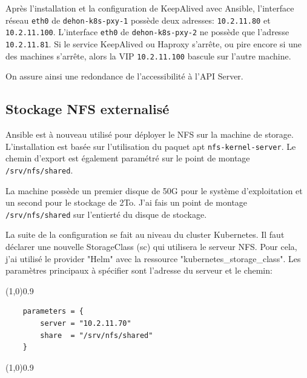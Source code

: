\documentclass[12pt]{article}
\begin{document}
Après l'installation et la configuration de KeepAlived avec \gls{Ansible}, l'interface réseau \verb|eth0| de \verb|dehon-k8s-pxy-1| possède deux adresses: \verb|10.2.11.80| et \verb|10.2.11.100|.
L'interface \verb|eth0| de \verb|dehon-k8s-pxy-2| ne possède que l'adresse \verb|10.2.11.81|.
Si le service KeepAlived ou Haproxy s'arrête, ou pire encore si une des machines s'arrête, alors la \gls{VIP}  \verb|10.2.11.100| bascule sur l'autre machine.

On assure ainsi une redondance de l'accessibilité à l'\gls{API} Server.

\subsection{Stockage NFS externalisé}
\gls{Ansible} est à nouveau utilisé pour déployer le NFS sur la machine de storage.
L'installation est basée sur l'utilisation du paquet apt \verb|nfs-kernel-server|.
Le chemin d'export est également paramétré sur le point de montage \verb|/srv/nfs/shared|.

La machine possède un premier disque de 50G pour le système d'exploitation et un second pour le stockage de 2To.
J'ai fais un point de montage \verb|/srv/nfs/shared| sur l'entierté du disque de stockage.

La suite de la configuration se fait au niveau du \gls{cluster} \gls{Kubernetes}.
Il faut déclarer une nouvelle StorageClass (sc) qui utilisera le serveur NFS.
Pour cela, j'ai utilisé le provider "Helm" avec la ressource "kubernetes\_storage\_class".
Les paramètres principaux à spécifier sont l'adresse du serveur et le chemin:
\vspace{-1ex}
\begin{code}
\vspace{-1ex}
\begin{center} 
    \line(1,0){0.9\textwidth} 
\end{center}
\vspace{-1ex}
\begin{verbatim}
    parameters = {
        server = "10.2.11.70"
        share  = "/srv/nfs/shared"
    }
\end{verbatim}
\vspace{-1ex}
\begin{center} 
    \line(1,0){0.9\textwidth} 
\end{center}
\vspace{-1ex}
\end{code}
\end{document}

